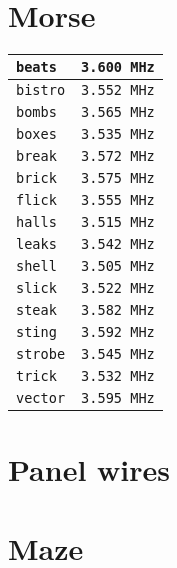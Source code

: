 \documentclass[]{article}
\begin{document}
\section{Morse}
\begin{tabular}{|l|l|}
	\hline \rule[-1ex]{0pt}{3.5ex} \texttt{beats}  & \texttt{3.600 MHz} \\
	\hline \rule[-1ex]{0pt}{3.5ex} \texttt{bistro} & \texttt{3.552 MHz} \\
	\hline \rule[-1ex]{0pt}{3.5ex} \texttt{bombs}  & \texttt{3.565 MHz} \\
	\hline \rule[-1ex]{0pt}{3.5ex} \texttt{boxes}  & \texttt{3.535 MHz} \\
	\hline \rule[-1ex]{0pt}{3.5ex} \texttt{break}  & \texttt{3.572 MHz} \\
	\hline \rule[-1ex]{0pt}{3.5ex} \texttt{brick}  & \texttt{3.575 MHz} \\
	\hline \rule[-1ex]{0pt}{3.5ex} \texttt{flick}  & \texttt{3.555 MHz} \\
	\hline \rule[-1ex]{0pt}{3.5ex} \texttt{halls}  & \texttt{3.515 MHz} \\
	\hline \rule[-1ex]{0pt}{3.5ex} \texttt{leaks}  & \texttt{3.542 MHz} \\
	\hline \rule[-1ex]{0pt}{3.5ex} \texttt{shell}  & \texttt{3.505 MHz} \\
	\hline \rule[-1ex]{0pt}{3.5ex} \texttt{slick}  & \texttt{3.522 MHz} \\
	\hline \rule[-1ex]{0pt}{3.5ex} \texttt{steak}  & \texttt{3.582 MHz} \\
	\hline \rule[-1ex]{0pt}{3.5ex} \texttt{sting}  & \texttt{3.592 MHz} \\
	\hline \rule[-1ex]{0pt}{3.5ex} \texttt{strobe} & \texttt{3.545 MHz} \\
	\hline \rule[-1ex]{0pt}{3.5ex} \texttt{trick}  & \texttt{3.532 MHz} \\
	\hline \rule[-1ex]{0pt}{3.5ex} \texttt{vector} & \texttt{3.595 MHz} \\
	\hline
\end{tabular}
\section{Panel wires}
\section{Maze}

\newpage
\end{document}
